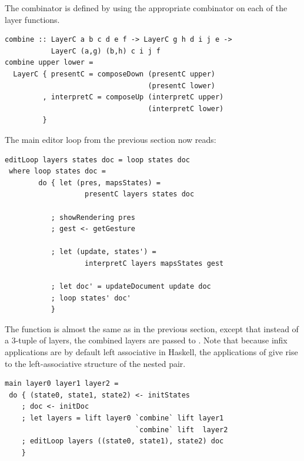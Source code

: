 \documentclass[preprint,natbib]{sigplanconf}
\begin{document}
The  combinator is defined by using the appropriate  combinator on each of the layer functions. 

\begin{small}
\begin{verbatim}
combine :: LayerC a b c d e f -> LayerC g h d i j e -> 
           LayerC (a,g) (b,h) c i j f
combine upper lower =
  LayerC { presentC = composeDown (presentC upper) 
                                  (presentC lower)
         , interpretC = composeUp (interpretC upper) 
                                  (interpretC lower)
         }
\end{verbatim}
\end{small}



The main editor loop from the previous section now reads:
 
\begin{small}
\begin{verbatim}
editLoop layers states doc = loop states doc
 where loop states doc = 
        do { let (pres, mapsStates) = 
                   presentC layers states doc
           
           ; showRendering pres
           ; gest <- getGesture
 
           ; let (update, states') = 
                   interpretC layers mapsStates gest
       
           ; let doc' = updateDocument update doc
           ; loop states' doc'
           }
\end{verbatim}
\end{small}

The  function is almost the same as in the previous section, except that instead of a 3-tuple of layers, the combined layers are passed to . Note that because infix applications are by default left associative in Haskell, the applications of  give rise to the left-associative structure of the nested pair.

\begin{small}
\begin{verbatim}
main layer0 layer1 layer2 = 
 do { (state0, state1, state2) <- initStates
    ; doc <- initDoc 
    ; let layers = lift layer0 `combine` lift layer1 
                               `combine` lift  layer2
    ; editLoop layers ((state0, state1), state2) doc
    }
\end{verbatim}
\end{small}
\end{document}
